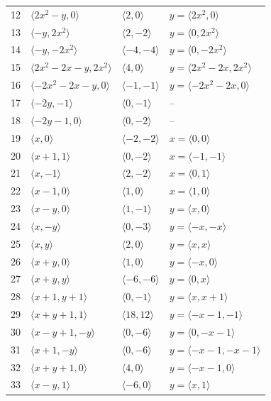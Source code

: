 \documentclass[11pt]{article}
\begin{document}
\begin{longtable}{@{}rlll@{}}
12 & $\langle 2x^{2}-y,0\rangle$ & $\langle 2,0\rangle$ & $y=\langle 2x^{2},0\rangle$\\
13 & $\langle -y,2x^{2}\rangle$ & $\langle 2,-2\rangle$ & $y=\langle 0,2x^{2}\rangle$\\
14 & $\langle -y,-2x^{2}\rangle$ & $\langle -4,-4\rangle$ & $y=\langle 0,-2x^{2}\rangle$\\
15 & $\langle 2x^{2}-2x-y,2x^{2}\rangle$ & $\langle 4,0\rangle$ & $y=\langle 2x^{2}-2x,2x^{2}\rangle$\\
16 & $\langle -2x^{2}-2x-y,0\rangle$ & $\langle -1,-1\rangle$ & $y=\langle -2x^{2}-2x,0\rangle$\\
17 & $\langle -2y,-1\rangle$ & $\langle 0,-1\rangle$ & --\\
18 & $\langle -2y-1,0\rangle$ & $\langle 0,-2\rangle$ & --\\
19 & $\langle x,0\rangle$ & $\langle -2,-2\rangle$ & $x=\langle 0,0\rangle$\\
20 & $\langle x+1,1\rangle$ & $\langle 0,-2\rangle$ & $x=\langle -1,-1\rangle$\\
21 & $\langle x,-1\rangle$ & $\langle 2,-2\rangle$ & $x=\langle 0,1\rangle$\\
22 & $\langle x-1,0\rangle$ & $\langle 1,0\rangle$ & $x=\langle 1,0\rangle$\\
23 & $\langle x-y,0\rangle$ & $\langle 1,-1\rangle$ & $y=\langle x,0\rangle$\\
24 & $\langle x,-y\rangle$ & $\langle 0,-3\rangle$ & $y=\langle -x,-x\rangle$\\
25 & $\langle x,y\rangle$ & $\langle 2,0\rangle$ & $y=\langle x,x\rangle$\\
26 & $\langle x+y,0\rangle$ & $\langle 1,0\rangle$ & $y=\langle -x,0\rangle$\\
27 & $\langle x+y,y\rangle$ & $\langle -6,-6\rangle$ & $y=\langle 0,x\rangle$\\
28 & $\langle x+1,y+1\rangle$ & $\langle 0,-1\rangle$ & $y=\langle x,x+1\rangle$\\
29 & $\langle x+y+1,1\rangle$ & $\langle 18,12\rangle$ & $y=\langle -x-1,-1\rangle$\\
30 & $\langle x-y+1,-y\rangle$ & $\langle 0,-6\rangle$ & $y=\langle 0,-x-1\rangle$\\
31 & $\langle x+1,-y\rangle$ & $\langle 0,-6\rangle$ & $y=\langle -x-1,-x-1\rangle$\\
32 & $\langle x+y+1,0\rangle$ & $\langle 4,0\rangle$ & $y=\langle -x-1,0\rangle$\\
33 & $\langle x-y,1\rangle$ & $\langle -6,0\rangle$ & $y=\langle x,1\rangle$\\

\end{longtable}
\end{document}
